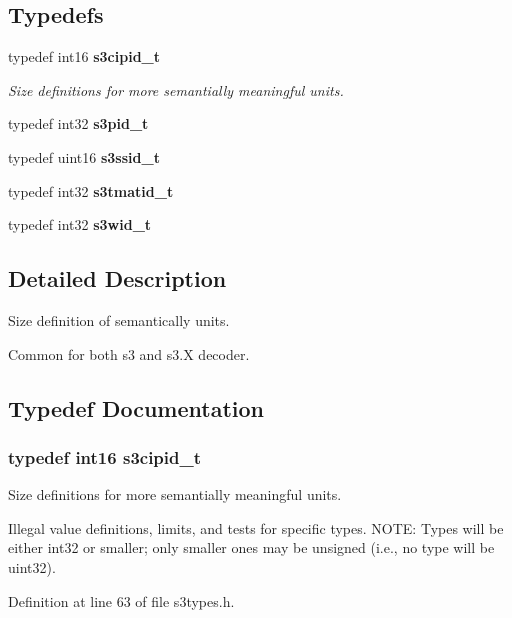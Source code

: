 \subsection*{Typedefs}
\begin{DoxyCompactItemize}
\item 
typedef int16 {\bf s3cipid\+\_\+t}
\begin{DoxyCompactList}\small\item\em Size definitions for more semantially meaningful units. \end{DoxyCompactList}\item 
typedef int32 {\bfseries s3pid\+\_\+t}\label{s3types_8h_ace0794ef7ba6d215e2688832216771b8}

\item 
typedef uint16 {\bfseries s3ssid\+\_\+t}\label{s3types_8h_afa911acbebf09269bbc7b6821aee9c1d}

\item 
typedef int32 {\bfseries s3tmatid\+\_\+t}\label{s3types_8h_a6a7df1b2c1909fbe51979dac693549c0}

\item 
typedef int32 {\bfseries s3wid\+\_\+t}\label{s3types_8h_a1d7fc272539abdf946c1074f9ec9a71c}

\end{DoxyCompactItemize}


\subsection{Detailed Description}
Size definition of semantically units. 

Common for both s3 and s3.\+X decoder. 

\subsection{Typedef Documentation}
\subsubsection[{s3cipid\+\_\+t}]{\setlength{\rightskip}{0pt plus 5cm}typedef int16 {\bf s3cipid\+\_\+t}}\label{s3types_8h_ae5f70241ce62a79747f0611029a6409d}


Size definitions for more semantially meaningful units. 

Illegal value definitions, limits, and tests for specific types. N\+O\+T\+E\+: Types will be either int32 or smaller; only smaller ones may be unsigned (i.\+e., no type will be uint32). 

Definition at line 63 of file s3types.\+h.

